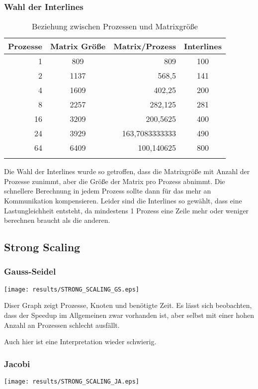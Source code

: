 \documentclass[a4paper,12pt]{scrartcl}
\begin{document}
\subsubsection{Wahl der Interlines}
\begin{longtable}{r|c|r|c}
Prozesse&Matrix Größe&Matrix/Prozess&Interlines \\ \hline \endhead 

1	&809	&809	&100\\
2	&1137	&568,5	&141\\
4	&1609	&402,25	&200\\
8	&2257	&282,125	&281\\
16	&3209	&200,5625	&400\\
24	&3929	&163,7083333333	&490\\
64	&6409	&100,140625	&800\\
\caption{Beziehung zwischen Prozessen und Matrixgröße}
\end{longtable}
Die Wahl der Interlines wurde so getroffen, dass die Matrixgröße mit Anzahl der Prozesse zunimmt, aber die Größe der Matrix pro Prozess abnimmt. Die schnellere Berechnung in jedem Prozess sollte dann für das mehr an Kommunikation kompensieren.
Leider sind die Interlines so gewählt, dass eine Lastungleichheit entsteht, da mindestens 1 Prozess eine Zeile mehr oder weniger berechnen braucht als die anderen.

\subsection{Strong Scaling}
\subsubsection{Gauss-Seidel}
\texttt{[image: results/STRONG\_SCALING\_GS.eps]}


Diser Graph zeigt Prozesse, Knoten und benötigte Zeit. Es lässt sich
beobachten, dass der Speedup im Allgemeinen zwar vorhanden ist, aber selbst
mit einer hohen Anzahl an Prozessen schlecht ausfällt.

Auch hier ist eine Interpretation wieder schwierig.

\subsubsection{Jacobi}
\texttt{[image: results/STRONG\_SCALING\_JA.eps]}

\end{document}
